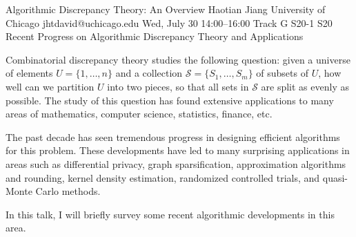 \begin{talk}
  {Algorithmic Discrepancy Theory: An Overview}%
  {Haotian Jiang}%
  {University of Chicago}%
  {jhtdavid@uchicago.edu}%
  {}%
  {}%
  {Wed, July 30 14:00–16:00 Track G}%
  {S20-1}%
  {S20}%
  {}
  {Recent Progress on Algorithmic Discrepancy Theory and Applications}
				
			
Combinatorial discrepancy theory studies the following question: given a universe of elements $U=\{1,\ldots, n\}$ and a collection $\mathcal{S} = \{S_1, \ldots, S_m\}$ of subsets of $U$, how well can we partition $U$ into two pieces, so that all sets in $\mathcal{S}$ are split as evenly as possible.
The study of this question has found extensive applications to many areas of mathematics, computer science, statistics, finance, etc. 

The past decade has seen tremendous progress in designing efficient algorithms for this problem. These developments have led to many surprising applications in areas such as differential privacy, graph sparsification, approximation algorithms and rounding, kernel density estimation, randomized controlled trials, and quasi-Monte Carlo methods.

In this talk, I will briefly survey some recent algorithmic developments in this area. 



\end{talk}


